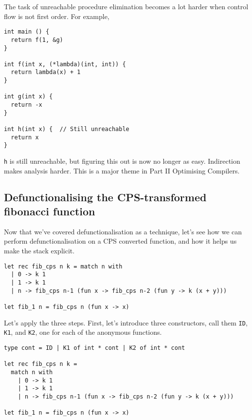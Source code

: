 The task of unreachable procedure elimination becomes a lot harder when control flow is not first order. For example,

\begin{code}
\label{code:unreachable-indirection-c}
\begin{verbatim}
int main () {
  return f(1, &g)
}

int f(int x, (*lambda)(int, int)) {
  return lambda(x) + 1
}

int g(int x) {
  return -x
}

int h(int x) {  // Still unreachable
  return x
}
\end{verbatim}
\end{code}

\texttt{h} is still unreachable, but figuring this out is now no longer as easy. Indirection makes analysis harder. This is a major theme in {\sffamily Part II Optimising Compilers}.

\subsection{Defunctionalising the CPS-transformed fibonacci function}
Now that we've covered defunctionalisation as a technique, let's see how we can perform defunctionalisation on a CPS converted function, and how it helps us make the stack explicit.

\begin{code}
\label{code:defun-fib-0}
\begin{verbatim}
let rec fib_cps n k = match n with
  | 0 -> k 1
  | 1 -> k 1
  | n -> fib_cps n-1 (fun x -> fib_cps n-2 (fun y -> k (x + y)))

let fib_1 n = fib_cps n (fun x -> x)
\end{verbatim}
\end{code}

Let's apply the three steps. First, let's introduce three constructors, call them \texttt{ID}, \texttt{K1}, and \texttt{K2}, one for each of the anonymous functions. 

\begin{code}
\label{code:defun-fib-1}
\begin{verbatim}
type cont = ID | K1 of int * cont | K2 of int * cont

let rec fib_cps n k = 
  match n with
    | 0 -> k 1
    | 1 -> k 1
    | n -> fib_cps n-1 (fun x -> fib_cps n-2 (fun y -> k (x + y)))

let fib_1 n = fib_cps n (fun x -> x)
\end{verbatim}
\end{code}


